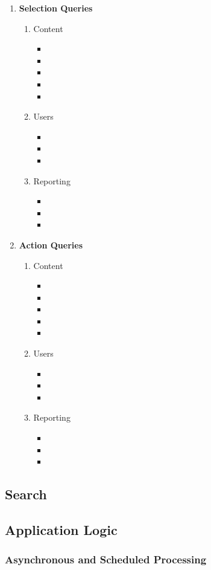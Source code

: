 \documentclass[12pt,letterpaper]{article}
\begin{document}
\begin{enumerate}
\item[] \begin{center} \textbf{Selection Queries} \end{center}
\begin{enumerate}
\item[] Content
\begin{itemize}
\item 
\item 
\item 
\item 
\item 
\end{itemize}
\item[] Users
\begin{itemize}
\item 
\item 
\item 
\end{itemize}
\item[] Reporting
\begin{itemize}
\item 
\item 
\item 
\end{itemize}
\end{enumerate}
\item[] \begin{center} \textbf{Action Queries} \end{center}
\begin{enumerate}
\item[] Content
\begin{itemize}
\item 
\item 
\item 
\item 
\item 
\end{itemize}
\item[] Users
\begin{itemize}
\item 
\item 
\item 
\end{itemize}
\item[] Reporting
\begin{itemize}
\item 
\item 
\item 
\end{itemize}
\end{enumerate}
\end{enumerate}





\subsection{Search}








\subsection{Application Logic}




\subsubsection{Asynchronous and Scheduled Processing}
\end{document}
